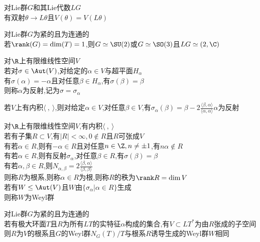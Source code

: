 \begin{dingli}
对Lie群$G$和其Lie代数$LG$\\
有双射$\theta\to L\theta$且$V(\theta)=V(L\theta)$
\end{dingli}

\begin{dingli}
对Lie群$G$为紧的且为连通的\\
若$\rank(G)=\dim(T)=1$,则$G\simeq \SU(2)$或$G\simeq \SO(3)$且$LG\simeq \sl(2,\C)$
\end{dingli}

\begin{dingyi}
对$\R$上有限维线性空间$V$\\
若对$\sigma\in \Aut(V)$,对给定的$\alpha\in V$与超平面$H_{\alpha}$\\
有$\sigma(\alpha)=-\alpha$且对任意$\beta\in H_{\alpha}$,有$\sigma(\beta)=\beta$\\
则称$\alpha$为反射,记为$\sigma=\sigma_{\alpha}$
\end{dingyi}

\begin{zhu}
若$V$上有内积$\langle\ ,\ \rangle$,则对给定$\alpha\in V$,对任意$\beta\in V$,有$\sigma_{\alpha}(\beta)=\beta-2\frac{\langle\beta,\alpha\rangle}{\langle\alpha,\alpha\rangle}\alpha$为反射
\end{zhu}

\begin{dingyi}
对$\R$上有限维线性空间$V$,有内积$\langle\ ,\ \rangle$\\
若有子集$R\subset V$,有$|R|<\infty,0\notin R$且$R$可张成$V$\\
有若$\alpha\in R$,则有$-\alpha\in R$且对任意$n\in \Z,n\neq \pm 1$,有$n\alpha\notin R$\\
有若$\alpha\in R$,则有反射$\sigma_{\alpha}$,对任意$\beta\in R$,有$\sigma(\beta)=\beta$\\
有若$\alpha,\beta\in R$,则$N_{\alpha,\beta}=2\frac{\langle\beta,\alpha\rangle}{\langle\beta,\beta\rangle}$\\
则称$R$为根系,则称$\alpha\in R$为根,则称$R$的秩为$\rank R=\dim V$\\
若有$W\leq \Aut(V)$且$W$由$\{\sigma_{\alpha}|\alpha\in R\}$生成\\
则称$W$为Weyl群
\end{dingyi}

\begin{dingli}
对Lie群$G$为紧的且为连通的\\
若有极大环面$T$且$R$为所有$LT$的实特征$\alpha$构成的集合,有$V\subset LT^{*}$为由$R$张成的子空间\\
则$R$为$V$的根系且$G$的Weyl群$N_{G}(T)/T$与根系$R$诱导生成的Weyl群$W$相同
\end{dingli}


